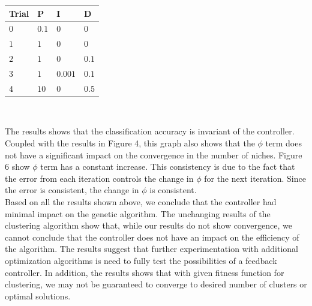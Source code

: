 \documentclass{sig-alternate}
\begin{document}
\begin{center}
\begin{tabular}{ l | l | l | l }
  Trial & P & I & D \\ \hline
  $0$ & $0.1$ & $0$ & $0$  \\
  $1$ &   $1$ & $0$ & $0$ \\
  $2$ &   $1$ & $0$ & $0.1$ \\
  $3$ &   $1$ & $0.001$ & $0.1$  \\
  $4$ &  $10$ & $0$ & $0.5$ 
\end{tabular} \\
\end{center}


The results shows that the classification accuracy is invariant of the controller. Coupled with the results in Figure 4, this graph also shows that the $\phi$ term does not have a significant impact on the convergence in the number of niches. Figure 6 show $\phi$ term has a constant increase. This consistency is due to the fact that the error from each iteration controls the change in $\phi$ for the next iteration. Since the error is consistent, the change in $\phi$ is consistent.\\
\indent Based on all the results shown above, we conclude that the controller had minimal impact on the genetic algorithm. The unchanging results of the clustering algorithm show that, while our results do not show convergence, we cannot conclude that the controller does not have an impact on the efficiency of the algorithm. The results suggest that further experimentation with additional optimization algorithms is need to fully test the possibilities of a feedback controller. In addition, the results shows that with given fitness function for clustering, we may not be guaranteed to converge to desired number of clusters or optimal solutions. 
\end{document}
